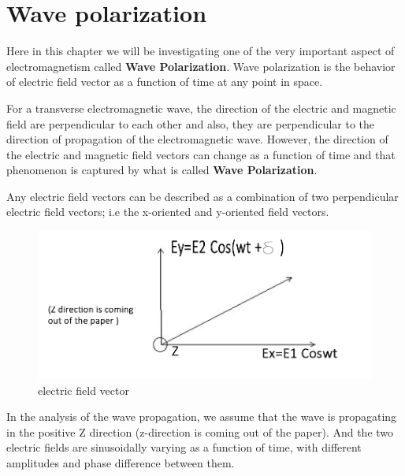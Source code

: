 \chapter{Wave polarization}\label{lec:lec23}
Here in this chapter we will be investigating one of the very important aspect of electromagnetism called \textbf{Wave Polarization}. Wave polarization is the behavior of electric field vector as a function of time at any point in space.

For a transverse electromagnetic wave, the direction of the electric and magnetic field are perpendicular to each other and also, they are perpendicular to the direction of propagation of the electromagnetic wave. However, the direction of the electric and magnetic field vectors can change as a function of time and that phenomenon is captured by what is called \textbf{Wave Polarization}.

Any electric field vectors can be described as a combination of two perpendicular electric field vectors; i.e the x-oriented and y-oriented field vectors. 
\begin{figure}[h]
\centering
\includegraphics[width=.8\linewidth]{./graphics/electricfield}
\caption{electric field vector}
\end{figure}

In the analysis of the wave propagation, we assume that the wave is propagating in the positive Z direction (z-direction is coming out of the paper). And the two electric fields are sinusoidally varying as a function of time, with different amplitudes and phase difference between them.	

